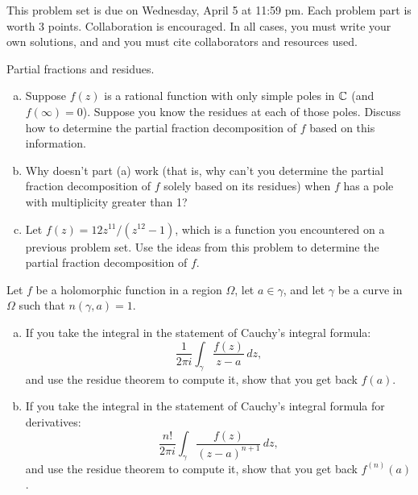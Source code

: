 \maketitle


This problem set is due on Wednesday, April 5 at 11:59 pm. Each problem part is worth 3 points. Collaboration is encouraged. In all cases, you must write your own solutions, and and you must cite collaborators and resources used.

\begin{problem}
  Partial fractions and residues.
  \begin{enumerate}[(a)]
    \item Suppose $f(z)$ is a rational function with only simple poles in $\mathbb{C}$ (and $f(\infty)=0$). Suppose you know the residues at each of those poles. Discuss how to determine the partial fraction decomposition of $f$ based on this information.
    \item Why doesn't part (a) work (that is, why can't you determine the partial fraction decomposition of $f$ solely based on its residues) when $f$ has a pole with multiplicity greater than 1?
    \item Let $f(z)=12z^{11}/(z^{12}-1)$, which is a function you encountered on a previous problem set. Use the ideas from this problem to determine the partial fraction decomposition of $f$.
  \end{enumerate}
\end{problem}

\begin{problem}
  Let $f$ be a holomorphic function in a region $\Omega$, let $a\in\gamma$, and let $\gamma$ be a curve in $\Omega$ such that $n(\gamma,a)=1$.
  \begin{enumerate}[(a)]
    \item If you take the integral in the statement of Cauchy's integral formula:
    \[\frac 1{2\pi i}\int_\gamma \frac{f(z)}{z-a}\,dz,\]
    and use the residue theorem to compute it, show that you get back $f(a)$.
    \item If you take the integral in the statement of Cauchy's integral formula for derivatives:
    \[\frac{n!}{2\pi i}\int_\gamma \frac{f(z)}{(z-a)^{n+1}}\,dz,\]
    and use the residue theorem to compute it, show that you get back $f^{(n)}(a)$.

  \end{enumerate}
\end{problem}

